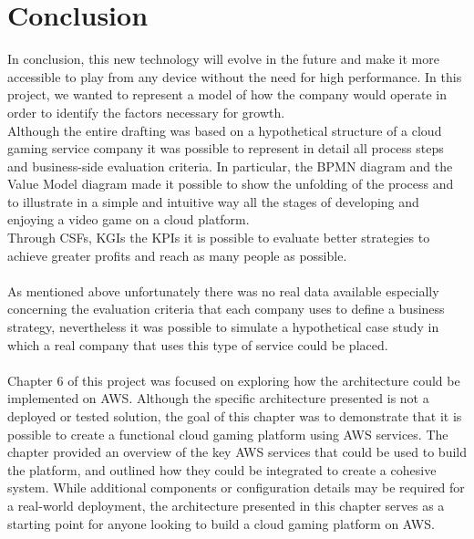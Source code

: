 \documentclass[a4paper,12pt]{report}
\begin{document}
\chapter{Conclusion}
In conclusion, this new technology will evolve in the future and make it more accessible to play from any device without the need for high performance. 
In this project, we wanted to represent a model of how the company would operate in order to identify the factors necessary for growth.\\
Although the entire drafting was based on a hypothetical structure of a cloud gaming service company it was possible to represent in detail all process steps and business-side evaluation criteria. In particular, the BPMN diagram and the Value Model diagram made it possible to show the unfolding of the process and to illustrate in a simple and intuitive way all the stages of developing and enjoying a video game on a cloud platform.\\
Through CSFs, KGIs the KPIs it is possible to evaluate better strategies to achieve greater profits and reach as many people as possible.\\\\
%
As mentioned above unfortunately there was no real data available especially concerning the evaluation criteria that each company uses to define a business strategy, nevertheless it was possible to simulate a hypothetical case study in which a real company that uses this type of service could be placed. \\\\
%
%
Chapter 6 of this project was focused on exploring how the architecture could be implemented on AWS. Although the specific architecture presented is not a deployed or tested solution, the goal of this chapter was to demonstrate that it is possible to create a functional cloud gaming platform using AWS services. The chapter provided an overview of the key AWS services that could be used to build the platform, and outlined how they could be integrated to create a cohesive system. While additional components or configuration details may be required for a real-world deployment, the architecture presented in this chapter serves as a starting point for anyone looking to build a cloud gaming platform on AWS. 
\end{document}
